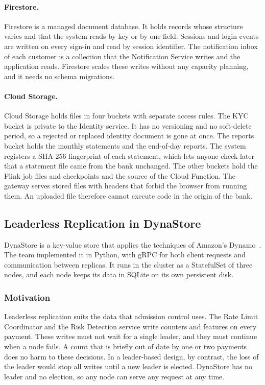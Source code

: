 \documentclass[11pt,a4paper]{article}
\begin{document}
\paragraph{Firestore.} Firestore is a managed document database. It holds records whose structure varies and that the system reads by key or by one field. Sessions and login events are written on every sign-in and read by session identifier. The notification inbox of each customer is a collection that the Notification Service writes and the application reads. Firestore scales these writes without any capacity planning, and it needs no schema migrations.

\paragraph{Cloud Storage.} Cloud Storage holds files in four buckets with separate access rules. The KYC bucket is private to the Identity service. It has no versioning and no soft-delete period, so a rejected or replaced identity document is gone at once. The reports bucket holds the monthly statements and the end-of-day reports. The system registers a SHA-256 fingerprint of each statement, which lets anyone check later that a statement file came from the bank unchanged. The other buckets hold the Flink job files and checkpoints and the source of the Cloud Function. The gateway serves stored files with headers that forbid the browser from running them. An uploaded file therefore cannot execute code in the origin of the bank.

\subsection{Leaderless Replication in DynaStore}
\label{sec:concept}

DynaStore is a key-value store that applies the techniques of Amazon's Dynamo~\cite{dynamo}. The team implemented it in Python, with gRPC for both client requests and communication between replicas. It runs in the cluster as a StatefulSet of three nodes, and each node keeps its data in SQLite on its own persistent disk.

\subsubsection{Motivation}

Leaderless replication suits the data that admission control uses. The Rate Limit Coordinator and the Risk Detection service write counters and features on every payment. These writes must not wait for a single leader, and they must continue when a node fails. A count that is briefly out of date by one or two payments does no harm to these decisions. In a leader-based design, by contrast, the loss of the leader would stop all writes until a new leader is elected. DynaStore has no leader and no election, so any node can serve any request at any time.
\end{document}
